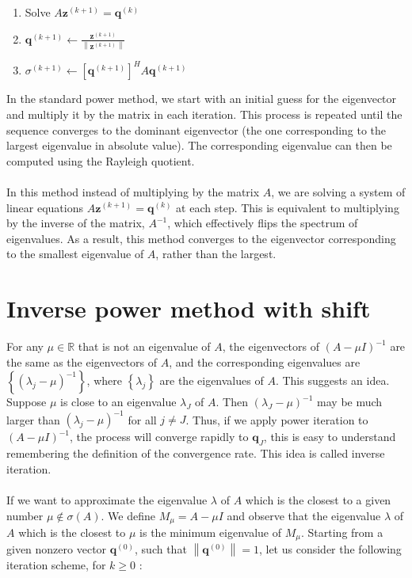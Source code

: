 \documentclass[11pt]{book}
\begin{document}
\begin{enumerate}
\item Solve $A \mathbf{z}^{(k+1)}=\mathbf{q}^{(k)}$
\item $\mathbf{q}^{(k+1)} \leftarrow \frac{\mathbf{z}^{(k+1)}}{\left\|\mathbf{z}^{(k+1)}\right\|}$
\item $\sigma^{(k+1)} \leftarrow\left[\mathbf{q}^{(k+1)}\right]^{H} A \mathbf{q}^{(k+1)}$
\end{enumerate}
In the standard power method, we start with an initial guess for the eigenvector and multiply it by the matrix in each iteration. This process is repeated until the sequence converges to the dominant eigenvector (the one corresponding to the largest eigenvalue in absolute value). The corresponding eigenvalue can then be computed using the Rayleigh quotient.\\ \\
In this method instead of multiplying by the matrix $A$, we are solving a system of linear equations $A \mathbf{z}^{(k+1)}=\mathbf{q}^{(k)}$ at each step. This is equivalent to multiplying by the inverse of the matrix, $A^{-1}$, which effectively flips the spectrum of eigenvalues. As a result, this method converges to the eigenvector corresponding to the smallest eigenvalue of $A$, rather than the largest.

\section*{Inverse power method with shift}
For any $\mu \in \mathbb{R}$ that is not an eigenvalue of $A$, the eigenvectors of $(A-\mu I)^{-1}$ are the same as the eigenvectors of $A$, and the corresponding eigenvalues are $\left\{\left(\lambda_j-\mu\right)^{-1}\right\}$, where $\left\{\lambda_j\right\}$ are the eigenvalues of $A$. This suggests an idea. Suppose $\mu$ is close to an eigenvalue $\lambda_J$ of $A$. Then $\left(\lambda_J-\mu\right)^{-1}$ may be much larger than $\left(\lambda_j-\mu\right)^{-1}$ for all $j \neq J$. Thus, if we apply power iteration to $(A-\mu I)^{-1}$, the process will converge rapidly to $\mathbf{q}_J$, this is easy to understand remembering the definition of the convergence rate. This idea is called inverse iteration.\\ \\
If we want to approximate the eigenvalue $\lambda$ of $A$ which is the closest to a given number $\mu \notin \sigma(A)$.
We define $M_{\mu}=A-\mu I$ and observe that the eigenvalue $\lambda$ of $A$ which is the closest to $\mu$ is the minimum eigenvalue of $M_{\mu}$.
Starting from a given nonzero vector $\mathbf{q}^{(0)}$, such that $\left\|\mathbf{q}^{(0)}\right\|=1$, let us consider the following iteration scheme, for $k \geq 0$ :
\end{document}
